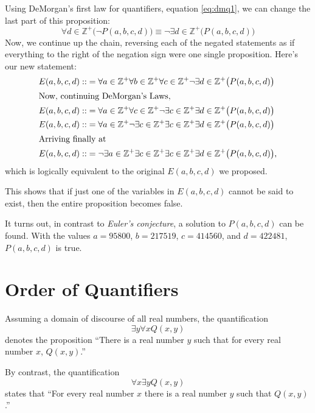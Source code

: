 \begin{ex}
Using DeMorgan's first law for quantifiers, equation \eqref{eq:dmq1}, we can change the last part of this proposition:
\[\forall d \in \mathbb{Z^+} \big(\neg P(a,b,c,d)\big)\equiv \neg \exists d \in \mathbb{Z^+} \big(P(a,b,c,d)\big)\]
Now, we continue up the chain, reversing each of the negated statements as if everything to the right of the negation sign were one single proposition.
Here's our new statement:
\begin{align*}
  E(a,b,c,d) : : &=
  \forall a \in \mathbb{Z^+}
  \forall b \in \mathbb{Z^+}
  \forall c \in \mathbb{Z^+}
  \neg\exists d \in \mathbb{Z^+}
  \big( P(a,b,c,d) \big)\\
  \intertext{Now, continuing DeMorgan's Laws,}
  E(a,b,c,d) : : &=
  \forall a \in \mathbb{Z^+}
  \forall c \in \mathbb{Z^+}
  \neg\exists c \in \mathbb{Z^+}
  \exists d \in \mathbb{Z^+}
  \big( P(a,b,c,d) \big)\\
  E(a,b,c,d) : : &=
  \forall a \in \mathbb{Z^+}
  \neg\exists c \in \mathbb{Z^+}
  \exists c \in \mathbb{Z^+}
  \exists d \in \mathbb{Z^+}
  \big( P(a,b,c,d) \big)\\
  \intertext{Arriving finally at}
  E(a,b,c,d) : : &=
  \neg\exists a \in \mathbb{Z^+}
  \exists c \in \mathbb{Z^+}
  \exists c \in \mathbb{Z^+}
  \exists d \in \mathbb{Z^+}
  \big( P(a,b,c,d) \big),\\
\end{align*}
which is logically equivalent to the original $E(a,b,c,d)$ we proposed.

This shows that if just one of the variables in $E(a,b,c,d)$ cannot be said to exist, then the entire proposition becomes false.

It turns out, in contrast to \emph{Euler's conjecture}, a solution to $P(a,b,c,d)$ can be found. With the values $a=95800$, $b=217519$, $c=414560$, and $d=422481$, $P(a,b,c,d)$ is true.
\end{ex}

\section{Order of Quantifiers}

Assuming a domain of discourse of all real numbers, the quantification
\begin{equation}
  \exists y \forall x Q(x, y)
\end{equation}
denotes the proposition
``There is a real number $y$ such that for every real number $x$, $Q(x, y)$.''

By contrast, the quantification
\begin{equation}
  \forall x \exists y Q(x, y)
\end{equation}
states that
``For every real number $x$ there is a real number $y$ such that $Q(x, y)$.''


